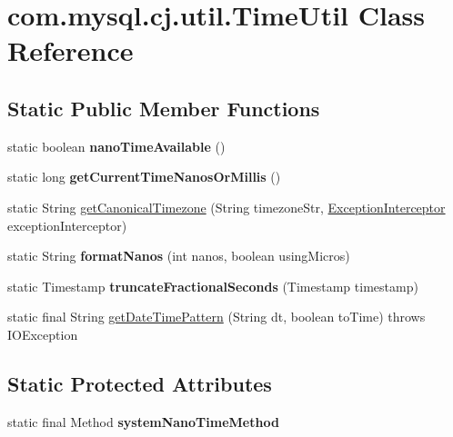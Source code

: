 \hypertarget{classcom_1_1mysql_1_1cj_1_1util_1_1_time_util}{}\section{com.\+mysql.\+cj.\+util.\+Time\+Util Class Reference}
\label{classcom_1_1mysql_1_1cj_1_1util_1_1_time_util}
\subsection*{Static Public Member Functions}
\begin{DoxyCompactItemize}
\item 
\mbox{\label{classcom_1_1mysql_1_1cj_1_1util_1_1_time_util_a51171936513c71403df7272e2919783f}} 
static boolean {\bfseries nano\+Time\+Available} ()
\item 
\mbox{\label{classcom_1_1mysql_1_1cj_1_1util_1_1_time_util_a224da639d5b047ba110cc88396c793f4}} 
static long {\bfseries get\+Current\+Time\+Nanos\+Or\+Millis} ()
\item 
static String \mbox{\hyperlink{classcom_1_1mysql_1_1cj_1_1util_1_1_time_util_a1b38bb130406d82a66ace616a2966b74}{get\+Canonical\+Timezone}} (String timezone\+Str, \mbox{\hyperlink{interfacecom_1_1mysql_1_1cj_1_1exceptions_1_1_exception_interceptor}{Exception\+Interceptor}} exception\+Interceptor)
\item 
\mbox{\label{classcom_1_1mysql_1_1cj_1_1util_1_1_time_util_a1dec8e63da6144ebf8d74f535566c4be}} 
static String {\bfseries format\+Nanos} (int nanos, boolean using\+Micros)
\item 
\mbox{\label{classcom_1_1mysql_1_1cj_1_1util_1_1_time_util_a49515b1a7c233172bd5fae6f0326c9be}} 
static Timestamp {\bfseries truncate\+Fractional\+Seconds} (Timestamp timestamp)
\item 
static final String \mbox{\hyperlink{classcom_1_1mysql_1_1cj_1_1util_1_1_time_util_a1da7f3d2dfbeaf21b375380c2d90b36a}{get\+Date\+Time\+Pattern}} (String dt, boolean to\+Time)  throws I\+O\+Exception 
\end{DoxyCompactItemize}
\subsection*{Static Protected Attributes}
\begin{DoxyCompactItemize}
\item 
\mbox{\label{classcom_1_1mysql_1_1cj_1_1util_1_1_time_util_ae26197a4c1007ca664e0be1cc14ca3e2}} 
static final Method {\bfseries system\+Nano\+Time\+Method}
\end{DoxyCompactItemize}


